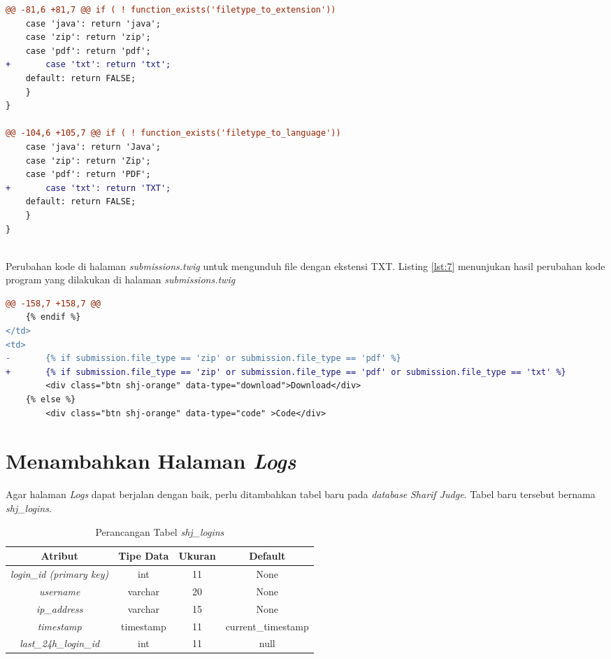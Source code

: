 \begin{lstlisting}[language=diff, caption=Perubahan kode program pada \textit{shj\_helper.php}, label=lst:6, basicstyle=\ttfamily, frame=single,
columns=fullflexible, keepspaces=true, breaklines=true]
@@ -81,6 +81,7 @@ if ( ! function_exists('filetype_to_extension'))
	case 'java': return 'java';
	case 'zip': return 'zip';
	case 'pdf': return 'pdf';
+   	case 'txt': return 'txt';
	default: return FALSE;
	}
}

@@ -104,6 +105,7 @@ if ( ! function_exists('filetype_to_language'))
	case 'java': return 'Java';
	case 'zip': return 'Zip';
	case 'pdf': return 'PDF';
+   	case 'txt': return 'TXT';
	default: return FALSE;
	}
}
\end{lstlisting}
~\\
Perubahan kode di halaman \textit{submissions.twig} untuk mengunduh file dengan ekstensi TXT. Listing \ref{lst:7} menunjukan hasil perubahan kode program yang dilakukan di halaman \textit{submissions.twig}

\begin{lstlisting}[language=diff, caption=Perubahan kode program pada halaman \textit{submission.twig}, label=lst:7, basicstyle=\ttfamily, frame=single,
columns=fullflexible, keepspaces=true, breaklines=true]
@@ -158,7 +158,7 @@
	{% endif %}
</td>
<td>
-   	{% if submission.file_type == 'zip' or submission.file_type == 'pdf' %}
+   	{% if submission.file_type == 'zip' or submission.file_type == 'pdf' or submission.file_type == 'txt' %}
		<div class="btn shj-orange" data-type="download">Download</div>
	{% else %}
		<div class="btn shj-orange" data-type="code" >Code</div>
\end{lstlisting}

\section{Menambahkan Halaman \textit{Logs}}%
\label{chap:logs}
Agar halaman \textit{Logs} dapat berjalan dengan baik, perlu ditambahkan tabel baru pada \textit{database} \textit{Sharif Judge}. Tabel baru tersebut bernama \textit{shj\_logins}. 
\begin{table}[H] %
	\centering 
	\caption{Perancangan Tabel \textit{shj\_logins}}
	\label{tab:tabellogs}
		\begin{tabular}{|c|c|c|c|}
			\hline
			\textbf{Atribut} & \textbf{Tipe Data} & \textbf{Ukuran}  & \textbf{Default} \\
			\hline
			\textit{login\_id (primary key)} & int & 11  & None \\
			\hline
			\textit{username} & varchar & 20  & None \\
			\hline
			\textit{ip\_address} & varchar & 15  & None \\
			\hline
			\textit{timestamp} & timestamp & 11  & current\_timestamp \\
			\hline
			\textit{last\_24h\_login\_id}	 & int & 11  & null \\
			\hline
		\end{tabular}
\end{table}

